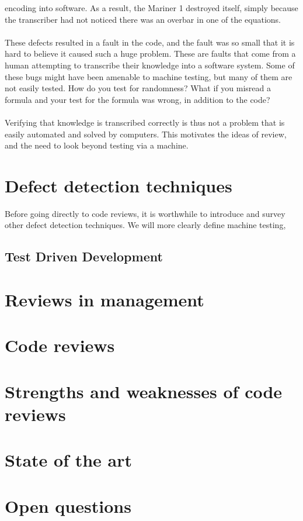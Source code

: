 encoding into software.
As a result, the Mariner 1 destroyed itself, simply because the transcriber had not noticed there
was an overbar in one of the equations.\\
\\
These defects resulted in a fault in the code, and the fault was so small that it is hard to believe
it caused such a huge problem.
These are faults that come from a human attempting to transcribe their knowledge into a software
system.
Some of these bugs might have been amenable to machine testing, but many of them are not easily
tested.
How do you test for randomness?
What if you misread a formula and your test for the formula was wrong, in addition to the code?\\
\\
Verifying that knowledge is transcribed correctly is thus not a problem that is easily automated and
solved by computers.
This motivates the ideas of review, and the need to look beyond testing via a machine.

\section{Defect detection techniques} \label{sec:litsurvey:defTechs}

Before going directly to code reviews, it is worthwhile to introduce and survey other defect
detection techniques.
We will more clearly define machine testing, 

\subsection{Test Driven Development} \label{subsec:litsurvey:testDD}

\section{Reviews in management} \label{sec:litsurvey:reviews}

\section{Code reviews} \label{sec:litsurvey:codeRev}

\section{Strengths and weaknesses of code reviews} \label{sec:litsurvey:strWeak}

\section{State of the art} \label{sec:litsurvey:current}

\section{Open questions}
